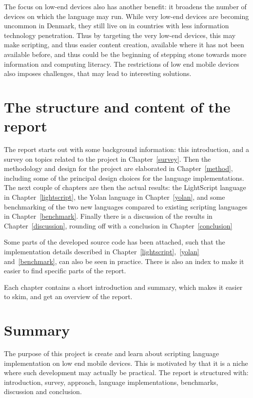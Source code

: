 \documentclass[11pt]{report}
\begin{document}
The focus on low-end devices also has another benefit:
it broadens the number of devices on which the language may run.
While very low-end devices are becoming uncommon in Denmark,
they still live on in countries with less information technology penetration.
Thus by targeting the very low-end devices, 
this may make scripting, and thus easier content creation,
available where it has not been available before,
and thus could be the beginning of stepping stone 
towards more information and computing literacy.
The restrictions of low end mobile devices also imposes challenges, that may lead to interesting solutions.

\begin{comment}
From a personal point of view, 
I would like to get started on development for mobile devices, 
and would also like to brush up on programming language implementation.
Design and implementation of a scripting language for mobile devices is spot on this topic.
\end{comment}


\section{The structure and content of the report}

The report starts out with some background information: this introduction, and a survey on topics related to the project in Chapter~\ref{survey}.
Then the methodology and design for the project are elaborated in Chapter~\ref{method}, including some of the principal design choices for the language implementations.
The next couple of chapters are then the actual results: the LightScript language in Chapter~\ref{lightscript}, the Yolan language in Chapter~\ref{yolan}, and some benchmarking of the two new languages compared to existing scripting languages in Chapter~\ref{benchmark}.
Finally there is a discussion of the results in Chapter~\ref{discussion}, rounding off with a conclusion in Chapter~\ref{conclusion}

Some parts of the developed source code has been attached, such that the implementation details described in Chapter~\ref{lightscript},~\ref{yolan} and~\ref{benchmark}, can also be seen in practice.
There is also an index to make it easier to find specific parts of the report.

Each chapter contains a short introduction and summary, which makes it easier to skim, and get an overview of the report.

\section{Summary}
The purpose of this project is create and learn about scripting language implementation on low end mobile devices.
This is motivated by that it is a niche where such development may actually be practical.
The report is structured with: introduction, survey, approach, language implementations, benchmarks, discussion and conclusion.
\end{document}

